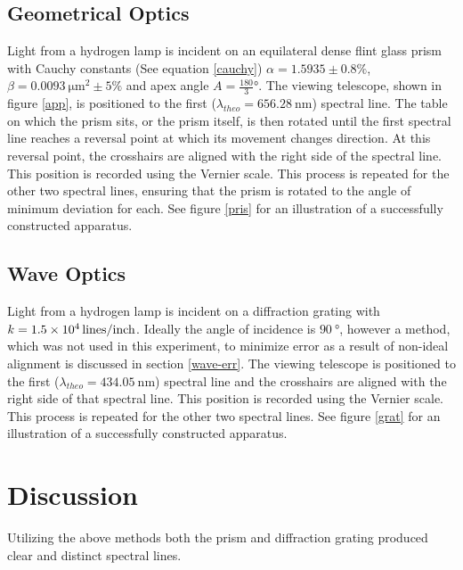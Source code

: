 \documentclass[10pt, twocolumn]{article}
\theoremstyle{definition}
\begin{document}
\subsection{Geometrical Optics}
Light from a hydrogen lamp is incident on an equilateral dense flint glass prism with Cauchy constants (See equation \eqref{cauchy})
$\alpha=1.5935\pm0.8\%$\cite{lab-manual}, $\beta=\qty{0.0093}{\micro\meter\squared}\pm5\%$\cite{lab-manual} and apex angle $A=\frac{180}{3}\unit{\degree}$. The viewing telescope, shown in figure \ref{app}, is positioned to the first ($\lambda_{theo}=\qty{656.28}{\nano\meter}$)
spectral line. The table on which the prism sits, or the prism itself, is then rotated until the first spectral line reaches a reversal point at which its movement changes direction.
At this reversal point, the crosshairs are aligned with the right side of the spectral line. This position is recorded using the Vernier scale. This process is repeated for the other two spectral lines,
ensuring that the prism is rotated to the angle of minimum deviation for each. See figure \ref{pris} for an illustration of a successfully constructed apparatus.
\subsection{Wave Optics}
Light from a hydrogen lamp is incident on a diffraction grating with $k=\qty{1.5d4}{lines\per inch}$. Ideally the angle of incidence is $\qty{90}{\degree}$,
however a method, which was not used in this experiment, to minimize error as a result of non-ideal alignment is discussed in section \ref{wave-err}.
The viewing telescope is positioned to the first ($\lambda_{theo}=\qty{434.05}{\nano\meter}$) spectral line and the crosshairs are aligned with the right side of
that spectral line. This position is recorded using the Vernier scale. This process is repeated for the other two spectral lines. See figure \ref{grat} for an illustration of a successfully constructed apparatus.
\vfill\eject
\section{Discussion}
Utilizing the above methods both the prism and diffraction grating produced clear and distinct spectral lines.
\end{document}

